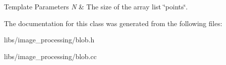 \begin{DoxyTemplParams}{Template Parameters}
{\em N} & The size of the array list \char`\"{}points\char`\"{}. \\
\hline
\end{DoxyTemplParams}


The documentation for this class was generated from the following files\+:\begin{DoxyCompactItemize}
\item 
libs/image\+\_\+processing/blob.\+h\item 
libs/image\+\_\+processing/blob.\+cc\end{DoxyCompactItemize}
